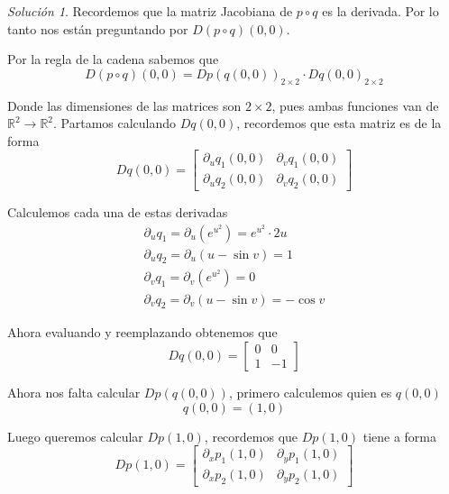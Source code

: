 \documentclass[a4paper,oneside,10.5pt]{article}
\newcommand\RR{\mathbb{R}}
\theoremstyle{definition}
\theoremstyle{plain}
\theoremstyle{remark}
\theoremstyle{theorem}
\newtheorem{sol}{Solución}
\begin{document}
\begin{sol}
Recordemos que la matriz Jacobiana de $p \circ q$ es la derivada. Por lo tanto nos están preguntando por $D(p \circ q)(0, 0)$.

Por la regla de la cadena sabemos que
\begin{equation*}
    D(p \circ q)(0, 0) = Dp(q(0, 0))_{2 \times 2} \cdot Dq(0, 0)_{2 \times 2}
\end{equation*}

Donde las dimensiones de las matrices son $2 \times 2$, pues ambas funciones van de $\RR^2 \to \RR^2$. Partamos calculando $Dq(0 ,0)$, recordemos que esta matriz es de la forma
\begin{equation*}
    Dq(0, 0) = \begin{bmatrix}
        \partial_u q_1(0, 0) & \partial_v q_1(0, 0)\\
        \partial_u q_2(0, 0) & \partial_v q_2(0, 0)
    \end{bmatrix}
\end{equation*}

Calculemos cada una de estas derivadas
\begin{gather*}
    \partial_u q_1 = \partial_u (e^{u^2}) = e^{u^2} \cdot 2 u\\
    \partial_u q_2 = \partial_u (u - \sin v) = 1\\
    \partial_v q_1 = \partial_v (e^{u^2}) = 0\\
    \partial_v q_2 = \partial_v (u - \sin v) = - \cos v
\end{gather*}

Ahora evaluando y reemplazando obtenemos que
\begin{equation*}
    Dq(0, 0) = \begin{bmatrix}
        0 & 0\\
        1 & -1
    \end{bmatrix}
\end{equation*}

Ahora nos falta calcular $Dp(q(0, 0))$, primero calculemos quien es $q(0, 0)$
\begin{equation*}
    q(0, 0) = (1, 0)
\end{equation*}

Luego queremos calcular $Dp(1, 0)$, recordemos que $Dp(1, 0)$ tiene a forma
\begin{equation*}
    Dp(1, 0) = \begin{bmatrix}
        \partial_x p_1(1, 0) & \partial_y p_1(1, 0)\\
        \partial_x p_2(1, 0) & \partial_y p_2(1, 0)
    \end{bmatrix}
\end{equation*}


\end{sol}
\end{document}
